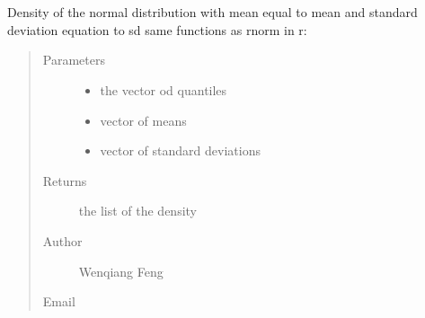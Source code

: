 \documentclass[letterpaper,11pt,english]{sphinxmanual}
\begin{document}
\section{}
\label{\detokenize{api:dnorm}}

\begin{fulllineitems}
Density of the normal distribution with mean
equal to mean and standard deviation equation to sd
same functions as rnorm in r: 
\begin{quote}\begin{description}
\item[{Parameters}] \leavevmode\begin{itemize}
\item {} 
 \textendash{} the vector od quantiles

\item {} 
 \textendash{} vector of means

\item {} 
 \textendash{} vector of standard deviations

\end{itemize}

\item[{Returns}] \leavevmode
the list of the density

\item[{Author}] \leavevmode
Wenqiang Feng

\item[{Email}] \leavevmode
{}

\end{description}\end{quote}

\end{fulllineitems}



\section{}
\label{\detokenize{api:runif}}
\end{document}
